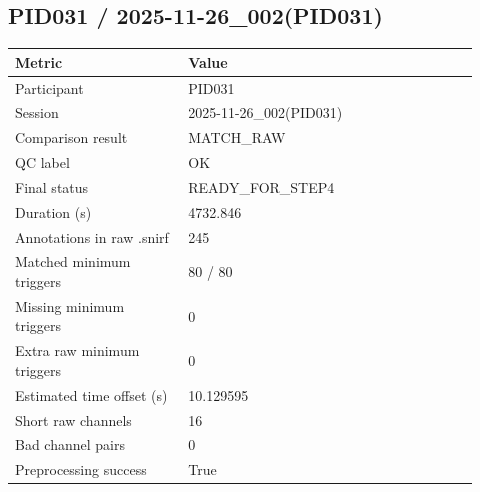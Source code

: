 \subsection*{PID031 / 2025-11-26\_002(PID031)}
\begin{tabular}{p{0.34\linewidth}p{0.58\linewidth}}
\toprule
Metric & Value\\
\midrule
Participant & PID031\\
Session & 2025-11-26\_002(PID031)\\
Comparison result & MATCH\_RAW\\
QC label & OK\\
Final status & READY\_FOR\_STEP4\\
Duration (s) & 4732.846\\
Annotations in raw .snirf & 245\\
Matched minimum triggers & 80 / 80\\
Missing minimum triggers & 0\\
Extra raw minimum triggers & 0\\
Estimated time offset (s) & 10.129595\\
Short raw channels & 16\\
Bad channel pairs & 0\\
Preprocessing success & True\\
\bottomrule
\end{tabular}
